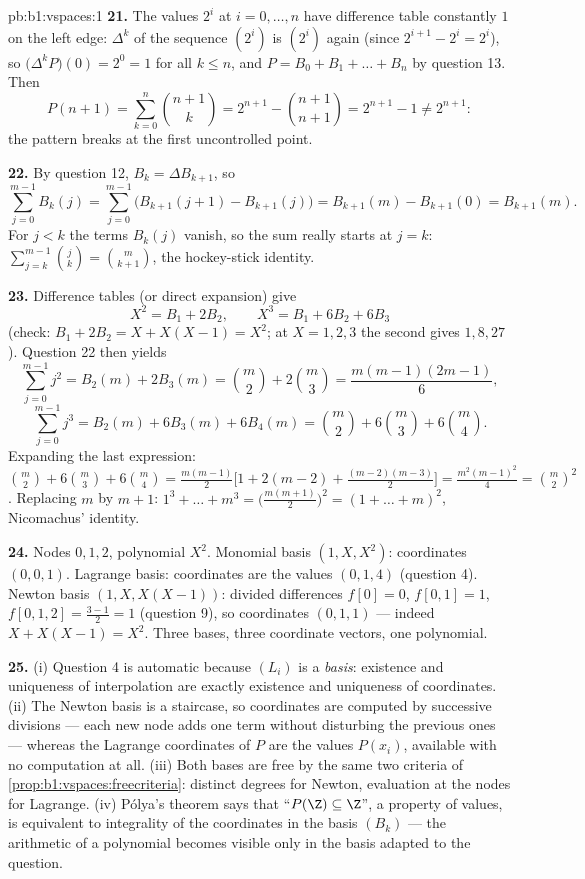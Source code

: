 \begin{solution}{pb:b1:vspaces:1}
\textbf{21.} The values $2^i$ at $i = 0, \dots, n$ have difference
table constantly $1$ on the left edge: $\Delta^k$ of the sequence
$(2^i)$ is $(2^i)$ again (since $2^{i+1} - 2^i = 2^i$), so
$\bigl(\Delta^k P\bigr)(0) = 2^0 = 1$ for all $k \leq n$, and $P =
B_0 + B_1 + \dots + B_n$ by question 13. Then
\[
P(n+1) = \sum_{k=0}^{n}\binom{n+1}{k}
= 2^{n+1} - \binom{n+1}{n+1} = 2^{n+1} - 1 \neq 2^{n+1}:
\]
the pattern breaks at the first uncontrolled point.

\textbf{22.} By question 12, $B_k = \Delta B_{k+1}$, so
\[
\sum_{j=0}^{m-1} B_k(j)
= \sum_{j=0}^{m-1}\bigl(B_{k+1}(j+1) - B_{k+1}(j)\bigr)
= B_{k+1}(m) - B_{k+1}(0) = B_{k+1}(m).
\]
For $j < k$ the terms $B_k(j)$ vanish, so the sum really starts at
$j = k$: $\sum_{j=k}^{m-1}\binom jk = \binom m{k+1}$, the
hockey-stick identity.

\textbf{23.} Difference tables (or direct expansion) give
\[
X^2 = B_1 + 2 B_2, \qquad X^3 = B_1 + 6 B_2 + 6 B_3
\]
(check: $B_1 + 2B_2 = X + X(X-1) = X^2$; at $X = 1, 2, 3$ the
second gives $1, 8, 27$). Question 22 then yields
\[
\sum_{j=0}^{m-1} j^2 = B_2(m) + 2B_3(m)
= \binom m2 + 2\binom m3 = \frac{m(m-1)(2m-1)}{6},
\]
\[
\sum_{j=0}^{m-1} j^3 = B_2(m) + 6B_3(m) + 6B_4(m)
= \binom m2 + 6\binom m3 + 6\binom m4 .
\]
Expanding the last expression: $\binom m2 + 6\binom m3 + 6\binom
m4 = \frac{m(m-1)}{2}\bigl[1 + 2(m-2) +
\frac{(m-2)(m-3)}{2}\bigr] = \frac{m^2(m-1)^2}{4} = \binom m2^2$.
Replacing $m$ by $m + 1$: $1^3 + \dots + m^3 =
\bigl(\frac{m(m+1)}2\bigr)^2 = (1 + \dots + m)^2$, Nicomachus'
identity.

\textbf{24.} Nodes $0, 1, 2$, polynomial $X^2$. Monomial basis
$(1, X, X^2)$: coordinates $(0, 0, 1)$. Lagrange basis:
coordinates are the values $(0, 1, 4)$ (question 4). Newton basis
$(1, X, X(X-1))$: divided differences $f[0] = 0$, $f[0,1] = 1$,
$f[0,1,2] = \frac{3 - 1}{2} = 1$ (question 9), so coordinates
$(0, 1, 1)$ --- indeed $X + X(X-1) = X^2$. Three bases, three
coordinate vectors, one polynomial.

\textbf{25.} (i) Question 4 is automatic because $(L_i)$ is a
\emph{basis}: existence and uniqueness of interpolation are
exactly existence and uniqueness of coordinates. (ii) The Newton
basis is a staircase, so coordinates are computed by successive
divisions --- each new node adds one term without disturbing the
previous ones --- whereas the Lagrange coordinates of $P$ are the
values $P(x_i)$, available with no computation at all. (iii) Both
bases are free by the same two criteria of
\cref{prop:b1:vspaces:freecriteria}: distinct degrees for Newton,
evaluation at the nodes for Lagrange. (iv) P\'olya's theorem says
that ``$P(\Z) \subseteq \Z$'', a property of values, is equivalent
to integrality of the coordinates in the basis $(B_k)$ --- the
arithmetic of a polynomial becomes visible only in the basis
adapted to the question.
\end{solution}
